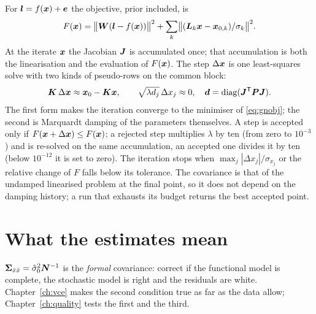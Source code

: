 For $\bm{l}=f(\bm{x})+\bm{e}$ the objective, prior included, is
\begin{equation}\label{eq:gnobj}
F(\bm{x})=\bigl\|\bm{W}(\bm{l}-f(\bm{x}))\bigr\|^2+\sum_k\bigl\|(\bm{L}_k\bm{x}-\bm{x}_{0,k})/\sigma_k\bigr\|^2 .
\end{equation}
At the iterate $\bm{x}$ the Jacobian $\bm{J}$ is accumulated once; that accumulation is both the
linearisation and the evaluation of $F(\bm{x})$. The step $\Delta\bm{x}$ is one least-squares solve
with two kinds of pseudo-rows on the common block:
\begin{equation}\label{eq:gnstep}
\bm{K}\,\Delta\bm{x}\approx\bm{x}_0-\bm{K}\bm{x},\qquad
\sqrt{\lambda d_j}\,\Delta x_j\approx0,\quad \bm{d}=\operatorname{diag}(\bm{J}^{\mathsf T}\bm{P}\bm{J}).
\end{equation}
The first form makes the iteration converge to the minimiser of \eqref{eq:gnobj}; the second is
Marquardt damping of the parameters themselves. A step is accepted only if
$F(\bm{x}+\Delta\bm{x})\le F(\bm{x})$; a rejected step multiplies $\lambda$ by ten (from zero to
$10^{-3}$) and is re-solved on the same accumulation, an accepted one divides it by ten (below
$10^{-12}$ it is set to zero). The iteration stops when $\max_j|\Delta x_j|/\sigma_{x_j}$ or the
relative change of $F$ falls below its tolerance. The covariance is that of the undamped
linearised problem at the final point, so it does not depend on the damping history; a run that
exhausts its budget returns the best accepted point.

\section{What the estimates mean}\label{sec:meaning}

$\bm{\Sigma}_{\hat x\hat x}=\hat\sigma_0^2\bm{N}^{-1}$ is the \emph{formal} covariance: correct if the
functional model is complete, the stochastic model is right and the residuals are white.
Chapter~\ref{ch:vce} makes the second condition true as far as the data allow;
Chapter~\ref{ch:quality} tests the first and the third.
